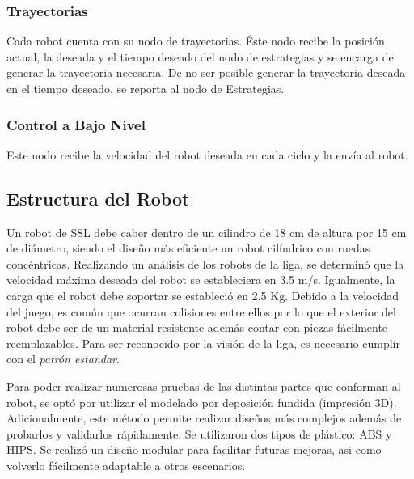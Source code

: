 \documentclass[twocolumn,10pt]{amrob}
\begin{document}
\subsubsection*{Trayectorias}
Cada robot cuenta con su nodo de trayectorias. Éste nodo recibe la posición actual, la deseada y el tiempo deseado del nodo de estrategias y se encarga de generar la trayectoria necesaria. De no ser posible generar la trayectoria deseada en el tiempo deseado, se reporta al nodo de Estrategias.
\subsubsection*{Control a Bajo Nivel}
Este nodo recibe la velocidad del robot deseada en cada ciclo y la envía al robot. 
\subsection*{Estructura del Robot}
Un robot de SSL debe caber dentro de un cilindro de 18 cm de altura por 15 cm de diámetro, siendo el diseño más eficiente un robot cilíndrico con ruedas concéntricas.
Realizando un análisis de los robots de la liga, se determinó que la velocidad máxima deseada del robot se estableciera en 3.5 m/s. Igualmente, la carga que el robot debe soportar se estableció en 2.5 Kg. Debido a la velocidad del juego, es común que ocurran colisiones entre ellos por lo que el exterior del robot debe ser de un material resistente además contar con piezas fácilmente reemplazables. Para ser reconocido por la visión de la liga, es necesario cumplir con el \textit{patrón estandar}. \par
Para poder realizar numerosas pruebas de las distintas partes que conforman al robot, se optó por utilizar el modelado por deposición fundida (impresión 3D). Adicionalmente, este método permite realizar diseños más complejos además de probarlos y validarlos rápidamente. Se utilizaron dos tipos de plástico: ABS y HIPS. Se realizó un diseño modular para facilitar futuras mejoras, asi como volverlo fácilmente adaptable a otros escenarios.\par
\end{document}

